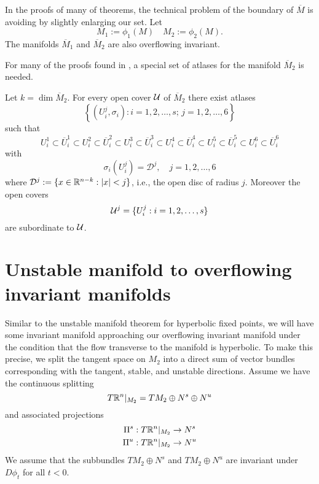 In the proofs of many of theorems, the technical problem of the boundary of \(\overline M\) is avoiding by slightly enlarging our set. Let 
\begin{equation}
	M_1 := \phi_1(M) \quad M_2 := \phi_2(M).
\end{equation}
The manifolds \(\overline M_1\) and \(\overline M_2\) are also overflowing invariant.

For many of the proofs found in \cite{wiggins1994normally}, a special set of atlases for the manifold \(\overline M_2\) is needed. 
\begin{prop}\label{atlases}
	Let \(k = \dim \overline M_2\). For every open cover \(\mathcal{U}\) of \(\overline M_2\) there exist atlases
	\begin{equation}
		\left\{  (U^j_i, \sigma_i) : i=1,2,\ldots, s;\, j = 1,2,\dots, 6 \right\}
	\end{equation}
	such that
	\begin{equation}
		U^1_i \subset \overline U^1_i  \subset U^2_i \subset \overline U^2_i  \subset U^3_i \subset \overline U^3_i  \subset U^4_i \subset \overline U^4_i  \subset U^5_i \subset \overline U^5_i  \subset U^6_i \subset \overline U^6_i  
	\end{equation}
	with 
	\begin{equation}
		\sigma_i(U^j_i) = \mathcal D^j, \quad j=1,2,\ldots, 6
	\end{equation}
	where \(\mathcal D^j := \{x\in \mathbb{R}^{n-k} : |x|< j\}\), i.e., the open disc of radius \(j\). Moreover the open covers
	\begin{equation}
		\mathcal{U}^j = \{U^j_i: i = 1,2,\ldots, s\}
	\end{equation}
	are subordinate to \(\mathcal{U}\).
\end{prop}
\section{Unstable manifold to overflowing invariant manifolds}\label{sec:unstable-manifold}

Similar to the unstable manifold theorem for hyperbolic fixed points, we will have some invariant manifold approaching our overflowing invariant manifold under the condition that the flow transverse to the manifold is hyperbolic. To make this precise, we split the tangent space on \(M_2\) into a direct sum of vector bundles corresponding with the tangent, stable, and unstable directions. Assume we have the continuous splitting
\begin{equation}
	T\mathbb{R}^n |_{M_2} = TM_2 \oplus N^s \oplus N^u 
\end{equation}
and associated projections
\begin{align}
	\Pi^s &: T\mathbb{R}^n|_{M_2} \to N^s \\
	\Pi^u &: T\mathbb{R}^n|_{M_2} \to N^u
\end{align}
We assume that the subbundles \(TM_2 \oplus N^s\) and \(TM_2 \oplus N^u\) are invariant under \(D\phi_t\) for all \(t< 0\).

